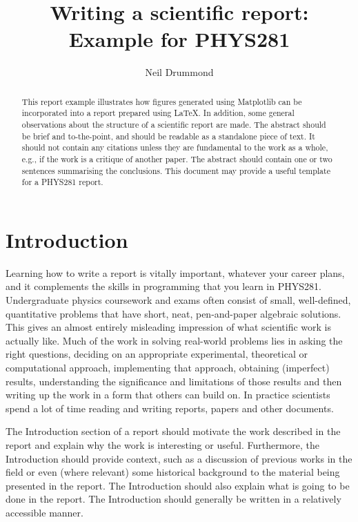 \documentclass[a4,12pt]{article}
\begin{document}
\title{Writing a scientific report: Example for PHYS281}

\author{Neil Drummond}

\maketitle

\begin{abstract}
This report example illustrates how figures generated using Matplotlib
can be incorporated into a report prepared using LaTeX\@.  In
addition, some general observations about the structure of a
scientific report are made.  The abstract should be brief and
to-the-point, and should be readable as a standalone piece of text. It
should not contain any citations unless they are fundamental to the
work as a whole, e.g., if the work is a critique of another paper.
The abstract should contain one or two sentences summarising the
conclusions.  This document may provide a useful template for a
PHYS281 report.
\end{abstract}

\tableofcontents

\section{Introduction}

Learning how to write a report is vitally important, whatever your
career plans, and it complements the skills in programming that you
learn in PHYS281.  Undergraduate physics coursework and exams often
consist of small, well-defined, quantitative problems that have short,
neat, pen-and-paper algebraic solutions.  This gives an almost
entirely misleading impression of what scientific work is actually
like.  Much of the work in solving real-world problems lies in asking
the right questions, deciding on an appropriate experimental,
theoretical or computational approach, implementing that approach,
obtaining (imperfect) results, understanding the significance and
limitations of those results and then writing up the work in a form
that others can build on.  In practice scientists spend a lot of time
reading and writing reports, papers and other documents.

The Introduction section of a report should motivate the work
described in the report and explain why the work is interesting or
useful.  Furthermore, the Introduction should provide context, such as
a discussion of previous works in the field or even (where relevant)
some historical background to the material being presented in the
report.  The Introduction should also explain what is going to be done
in the report.  The Introduction should generally be written in a
relatively accessible manner.
\end{document}
